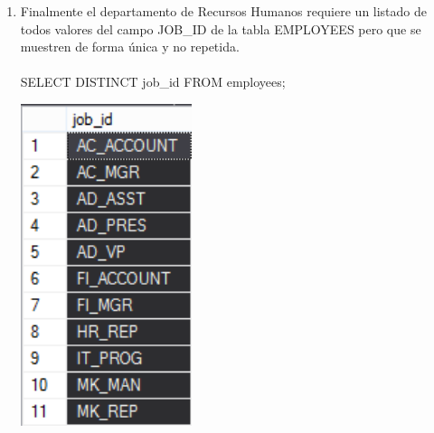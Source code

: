 \begin{enumerate}[1.]
	\item Finalmente el departamento de Recursos Humanos requiere un listado de todos valores del campo JOB\_ID de la tabla EMPLOYEES pero que se muestren de forma única y no repetida.
	\\
	\\SELECT DISTINCT job\_id FROM employees; 

	\begin{center}
	\includegraphics[width=5cm]{./Imagenes/423} 
	\end{center}

\end{enumerate}


